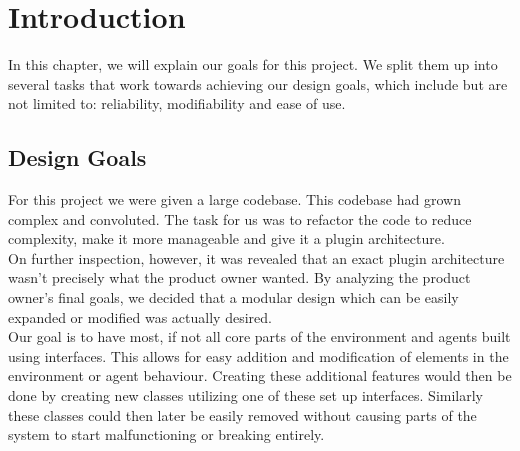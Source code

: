 \chapter{Introduction}

In this chapter, we will explain our goals for this project.
We split them up into several tasks that work towards achieving our design
goals, which include but are not limited to: reliability, modifiability and
ease of use.

\section{Design Goals}
For this project we were given a large codebase. This codebase had grown
complex and convoluted. The task for us was to refactor the code to reduce
complexity, make it more manageable and give it a plugin architecture. \\ On
further inspection, however, it was revealed that an exact plugin architecture
wasn't precisely what the product owner wanted. By analyzing the product
owner's final goals, we decided that a modular design which can be easily
expanded or modified was actually desired. \\ 
Our goal is to have most, if not all core parts of the environment and agents
built using interfaces. This allows for easy addition and modification of
elements in the environment or agent behaviour. Creating these additional
features would then be done by creating new classes utilizing one of these set
up interfaces. Similarly these classes could then later be easily removed
without causing parts of the system to start malfunctioning or breaking
entirely. \\

